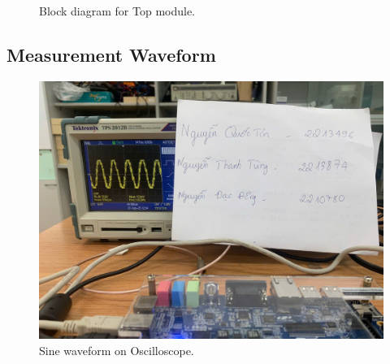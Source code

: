 \begin{figure}[H]
	\centering
	\caption{Block diagram for Top module.}
\end{figure}

\subsection{Measurement Waveform}

\begin{figure}[H]
	\centering
	\includegraphics[width=.9\linewidth]{./my-chapters/my-images/Gen_wave/hinh2.jpg}
	\caption{Sine waveform on Oscilloscope.}
\end{figure}

